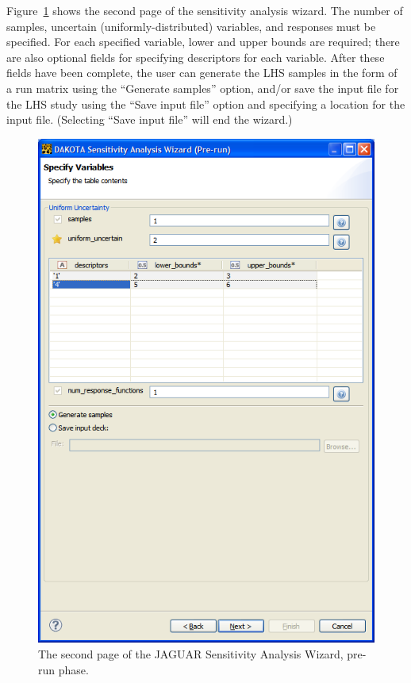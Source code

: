 Figure~\ref{fig:input:jag_wizard3} shows the second page of the
sensitivity analysis wizard.  The number of samples, uncertain
(uniformly-distributed) variables, and responses must be specified.
For each specified variable, lower and upper bounds are required;
there are also optional fields for specifying descriptors for each
variable.  After these fields have been complete, the user can
generate the LHS samples in the form of a run matrix using the
``Generate samples'' option, and/or save the input file for the LHS
study using the ``Save input file'' option and specifying a location
for the input file. (Selecting ``Save input file'' will end the
wizard.)
\begin{figure}
  \centering
  \includegraphics[scale=0.5]{images/jag_wizard3}
  \caption{The second page of the JAGUAR Sensitivity Analysis Wizard,
  pre-run phase.}
  \label{fig:input:jag_wizard3}
\end{figure}

